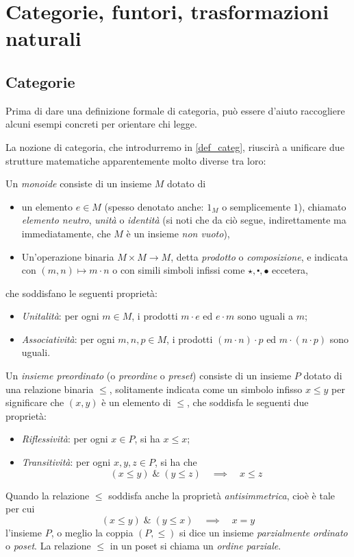 \chapter{Categorie, funtori, trasformazioni naturali}\label{chap_cat_fun_nat}
\section{Categorie}\label{sec_categorie}

Prima di dare una definizione formale di categoria, può essere d'aiuto raccogliere alcuni esempi concreti per orientare chi legge.

La nozione di categoria, che introdurremo in \ref{def_categ}, riuscirà a unificare due strutture matematiche apparentemente molto diverse tra loro:
\begin{definition}\label{prelim_def_monoide}
	Un \emph{monoide} consiste di un insieme \(M\) dotato di
	\begin{itemize}
		\item un elemento \(e\in M\) (spesso denotato anche: \(1_M\) o semplicemente \(1\)), chiamato \emph{elemento neutro}, \emph{unità} o \emph{identità} (si noti che da ciò segue, indirettamente ma immediatamente, che \(M\) è un insieme \emph{non vuoto}),
		\item Un'operazione binaria \(M\times M\to M\), detta \emph{prodotto} o \emph{composizione}, e indicata con \((m,n)\mapsto m\cdot n\) o con simili simboli infissi come \(\star, \centerdot,\bullet\) eccetera,
	\end{itemize}
	che soddisfano le seguenti proprietà:
	\begin{itemize}
		\item \emph{Unitalità}: per ogni \(m\in M\), i prodotti \(m \cdot e\) ed \(e\cdot m\) sono uguali a \(m\);
		\item \emph{Associatività}: per ogni \(m,n,p\in M\), i prodotti \((m\cdot n)\cdot p\) ed \(m\cdot (n\cdot p)\) sono uguali.
	\end{itemize}
\end{definition}
\begin{definition}\label{prelim_def_preset}
	Un \emph{insieme preordinato} (o \emph{preordine} o \emph{preset}) consiste di un insieme \(P\) dotato di una relazione binaria \(\le\), solitamente indicata come un simbolo infisso \(x\le y\) per significare che \((x,y)\) è un elemento di \(\le\), che soddisfa le seguenti due proprietà:
	\begin{itemize}
		\item \emph{Riflessività}: per ogni \(x\in P\), si ha \(x\le x\);
		\item \emph{Transitività}: per ogni \(x,y,z\in P\), si ha che
		      \[(x\le y)\;\&\;(y\le z) \quad\implies\quad x\le z\]
	\end{itemize}
	Quando la relazione \(\le\) soddisfa anche la proprietà \emph{antisimmetrica}, cioè è tale per cui
	\[(x\le y)\;\&\;(y\le x) \quad\implies\quad x = y\]
	l'insieme \(P\), o meglio la coppia \((P,\le)\) si dice un insieme \emph{parzialmente ordinato} o \emph{poset}. La relazione \(\le\) in un poset si chiama un \emph{ordine parziale}.
\end{definition}
